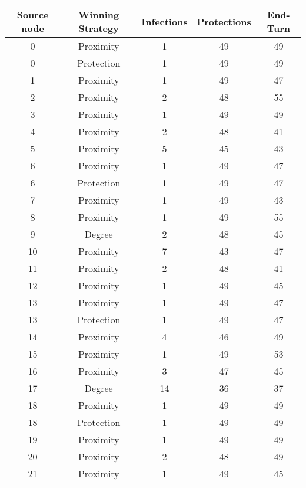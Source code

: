 \documentclass[results.tex]{subfiles}
\begin{document}
\begin{center}
  \begin{tabular}{| c || c | c | c | c |}
    \hline
    {\bfseries Source node} & {\bfseries Winning Strategy} & {\bfseries Infections} & {\bfseries Protections} & {\bfseries End-Turn} \\  %
    \hline\hline
    0 & Proximity & 1 & 49 & 49 \\ 
    \hline
    0 & Protection & 1 & 49 & 49 \\ 
    \hline
    1 & Proximity & 1 & 49 & 47 \\ 
    \hline
    2 & Proximity & 2 & 48 & 55 \\ 
    \hline
    3 & Proximity & 1 & 49 & 49 \\ 
    \hline
    4 & Proximity & 2 & 48 & 41 \\ 
    \hline
    5 & Proximity & 5 & 45 & 43 \\ 
    \hline
    6 & Proximity & 1 & 49 & 47 \\ 
    \hline
    6 & Protection & 1 & 49 & 47 \\ 
    \hline
    7 & Proximity & 1 & 49 & 43 \\ 
    \hline
    8 & Proximity & 1 & 49 & 55 \\ 
    \hline
    9 & Degree & 2 & 48 & 45 \\ 
    \hline
    10 & Proximity & 7 & 43 & 47 \\ 
    \hline
    11 & Proximity & 2 & 48 & 41 \\ 
    \hline
    12 & Proximity & 1 & 49 & 45 \\ 
    \hline
    13 & Proximity & 1 & 49 & 47 \\ 
    \hline
    13 & Protection & 1 & 49 & 47 \\ 
    \hline
    14 & Proximity & 4 & 46 & 49 \\ 
    \hline
    15 & Proximity & 1 & 49 & 53 \\ 
    \hline
    16 & Proximity & 3 & 47 & 45 \\ 
    \hline
    17 & Degree & 14 & 36 & 37 \\ 
    \hline
    18 & Proximity & 1 & 49 & 49 \\ 
    \hline
    18 & Protection & 1 & 49 & 49 \\ 
    \hline
    19 & Proximity & 1 & 49 & 49 \\ 
    \hline
    20 & Proximity & 2 & 48 & 49 \\ 
    \hline
    21 & Proximity & 1 & 49 & 45 \\ 

\end{tabular}
\end{center}
\end{document}
